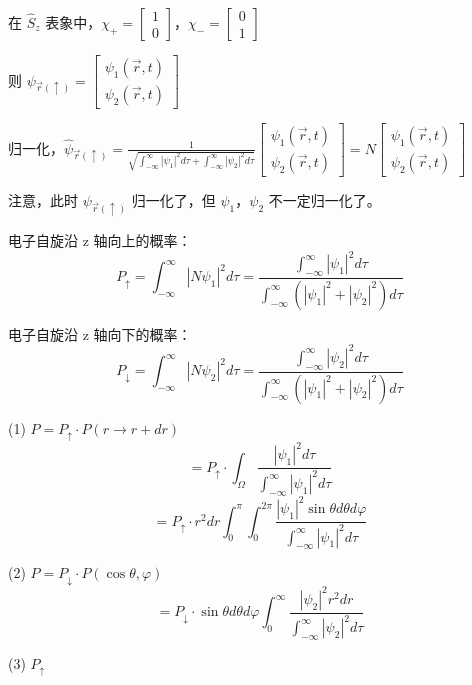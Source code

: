 \documentclass[lang=cn,10pt]{elegantbook}
\begin{document}
\begin{solution}
	在 $\hat{S}_z$ 表象中，$\chi_+ = \begin{bmatrix} 1 \\ 0 \end{bmatrix}$，$\chi_- = \begin{bmatrix} 0 \\ 1 \end{bmatrix}$
	
	则 $\psi_{\vec{r}(\uparrow)} = \begin{bmatrix} \psi_{1}(\vec{r}, t) \\ \psi_{2}(\vec{r}, t) \end{bmatrix}$
	
	归一化，$\hat{\psi}_{\vec{r}(\uparrow)} = \frac{1}{\sqrt{\int_{-\infty}^{\infty} |\psi_{1}|^2 d\tau + \int_{-\infty}^{\infty} |\psi_{2}|^2 d\tau}} \begin{bmatrix} \psi_{1}(\vec{r}, t) \\ \psi_{2}(\vec{r}, t) \end{bmatrix} = N \begin{bmatrix} \psi_{1}(\vec{r}, t) \\ \psi_{2}(\vec{r}, t) \end{bmatrix}$
	
	注意，此时 $\psi_{\vec{r}(\uparrow)}$ 归一化了，但 $\psi_{1}$，$\psi_{2}$ 不一定归一化了。
	
	电子自旋沿 z 轴向上的概率：
	\[
	P_{\uparrow} = \int_{-\infty}^{\infty} |N \psi_{1}|^2 d\tau = \frac{\int_{-\infty}^{\infty} |\psi_{1}|^2 d\tau}{\int_{-\infty}^{\infty} (|\psi_{1}|^2 + |\psi_{2}|^2) d\tau}
	\]
	
	电子自旋沿 z 轴向下的概率：
	\[
	P_{\downarrow} = \int_{-\infty}^{\infty} |N \psi_{2}|^2 d\tau = \frac{\int_{-\infty}^{\infty} |\psi_{2}|^2 d\tau}{\int_{-\infty}^{\infty} (|\psi_{1}|^2 + |\psi_{2}|^2) d\tau}
	\]
	
	(1) $P = P_{\uparrow} \cdot P(r \rightarrow r + dr)$
	\[
	= P_{\uparrow} \cdot \int_{\Omega} \frac{|\psi_{1}|^2 d\tau}{\int_{-\infty}^{\infty} |\psi_{1}|^2 d\tau}
	\]
	\[
	= P_{\uparrow} \cdot r^2 dr \int_{0}^{\pi} \int_{0}^{2\pi} \frac{|\psi_{1}|^2 \sin\theta d\theta d\varphi}{\int_{-\infty}^{\infty} |\psi_{1}|^2 d\tau}
	\]
	
	(2) $P = P_{\downarrow} \cdot P(\cos\theta, \varphi)$
	\[
	= P_{\downarrow} \cdot \sin\theta d\theta d\varphi \int_{0}^{\infty} \frac{|\psi_{2}|^2 r^2 dr}{\int_{-\infty}^{\infty} |\psi_{2}|^2 d\tau}
\]
	
	(3) $P_{\uparrow}$
\end{solution}
\end{document}
